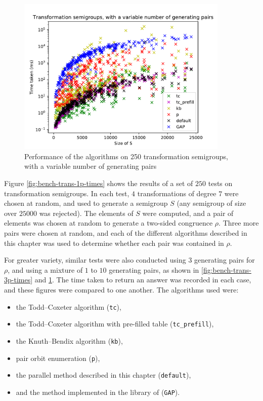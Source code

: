 \begin{figure}[p]
  \centering
  \includegraphics[width=0.9\textwidth]{pics/ch-pairs/bench-trans-vp-times}
  \caption[Benchmark: all algorithms, concrete, $n$ pairs]
  {Performance of the algorithms on 250 transformation semigroups, with
    a variable number of generating pairs}
  \label{fig:bench-trans-vp-times}
\end{figure}

Figure \ref{fig:bench-trans-1p-times} shows the results of a set of $250$ tests
on transformation semigroups.  In each test, $4$ transformations of degree $7$
were chosen at random, and used to generate a semigroup $S$ (any semigroup of
size over $25000$ was rejected).  The elements of $S$ were computed, and a pair
of elements was chosen at random to generate a two-sided congruence $\rho$.  Three more
pairs were chosen at random, and each of the different algorithms described in
this chapter was used to determine whether each pair was contained in $\rho$.

For greater variety, similar tests were also conducted using $3$ generating
pairs for $\rho$, and using a mixture of $1$ to $10$ generating pairs,
as shown in \ref{fig:bench-trans-3p-times} and \ref{fig:bench-trans-vp-times}.
The time taken to return an answer was recorded in each case, and these figures
were compared to one another.  The algorithms used were:
\begin{itemize}
\item the Todd--Coxeter algorithm (\texttt{tc}),
\item the Todd--Coxeter algorithm with pre-filled table (\texttt{tc\_prefill}),
\item the Knuth--Bendix algorithm (\texttt{kb}),
\item pair orbit enumeration (\texttt{p}),
\item the parallel method described in this chapter (\texttt{default}),
\item and the method implemented in the library of \GAP{} (\texttt{GAP}).
\end{itemize}

